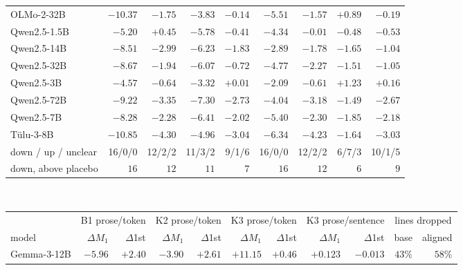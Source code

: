\begin{table}[tb]
\begin{tabular}{lrrrrrrrr}
OLMo-2-32B & $\mathbf{-10.37}$ & $\mathbf{-1.75}$ & $\mathbf{-3.83}$ & $-0.14$ & $\mathbf{-5.51}$ & $\mathbf{-1.57}$ & $\mathbf{+0.89}$ & $-0.19$ \\
Qwen2.5-1.5B & $\mathbf{-5.20}$ & $+0.45$ & $\mathbf{-5.78}$ & $-0.41$ & $\mathbf{-4.34}$ & $-0.01$ & $-0.48$ & $-0.53$ \\
Qwen2.5-14B & $\mathbf{-8.51}$ & $\mathbf{-2.99}$ & $\mathbf{-6.23}$ & $\mathbf{-1.83}$ & $\mathbf{-2.89}$ & $\mathbf{-1.78}$ & $\mathbf{-1.65}$ & $\mathbf{-1.04}$ \\
Qwen2.5-32B & $\mathbf{-8.67}$ & $\mathbf{-1.94}$ & $\mathbf{-6.07}$ & $\mathbf{-0.72}$ & $\mathbf{-4.77}$ & $\mathbf{-2.27}$ & $\mathbf{-1.51}$ & $\mathbf{-1.05}$ \\
Qwen2.5-3B & $\mathbf{-4.57}$ & $-0.64$ & $\mathbf{-3.32}$ & $+0.01$ & $\mathbf{-2.09}$ & $-0.61$ & $\mathbf{+1.23}$ & $+0.16$ \\
Qwen2.5-72B & $\mathbf{-9.22}$ & $\mathbf{-3.35}$ & $\mathbf{-7.30}$ & $\mathbf{-2.73}$ & $\mathbf{-4.04}$ & $\mathbf{-3.18}$ & $\mathbf{-1.49}$ & $\mathbf{-2.67}$ \\
Qwen2.5-7B & $\mathbf{-8.28}$ & $\mathbf{-2.28}$ & $\mathbf{-6.41}$ & $\mathbf{-2.02}$ & $\mathbf{-5.40}$ & $\mathbf{-2.30}$ & $\mathbf{-1.85}$ & $\mathbf{-2.18}$ \\
T\"ulu-3-8B & $\mathbf{-10.85}$ & $\mathbf{-4.30}$ & $\mathbf{-4.96}$ & $\mathbf{-3.04}$ & $\mathbf{-6.34}$ & $\mathbf{-4.23}$ & $\mathbf{-1.64}$ & $\mathbf{-3.03}$ \\
\midrule down / up / unclear & 16/0/0 & 12/2/2 & 11/3/2 & 9/1/6 & 16/0/0 & 12/2/2 & 6/7/3 & 10/1/5 \\
down, above placebo & $16$ & $12$ & $11$ & $7$ & $16$ & $12$ & $6$ & $9$ \\
\bottomrule\end{tabular}
\\[6pt]
\begin{tabular}{lrrrrrrrrrr}\toprule
 & \multicolumn{2}{c}{B1 prose/token} & \multicolumn{2}{c}{K2 prose/token} & \multicolumn{2}{c}{K3 prose/token} & \multicolumn{2}{c}{K3 prose/sentence} & \multicolumn{2}{c}{lines dropped} \\
\cmidrule(lr){2-3}\cmidrule(lr){4-5}\cmidrule(lr){6-7}\cmidrule(lr){8-9}\cmidrule(lr){10-11}
model & $\Delta M_1$ & $\Delta$1st & $\Delta M_1$ & $\Delta$1st & $\Delta M_1$ & $\Delta$1st & $\Delta M_1$ & $\Delta$1st & base & aligned \\ \midrule
Gemma-3-12B & $\mathbf{-5.96}$ & $\mathbf{+2.40}$ & $\mathbf{-3.90}$ & $\mathbf{+2.61}$ & $\mathbf{+11.15}$ & $+0.46$ & $\mathbf{+0.123}$ & $-0.013$ & $43\%$ & $58\%$ \\

\end{tabular}
\end{table}
